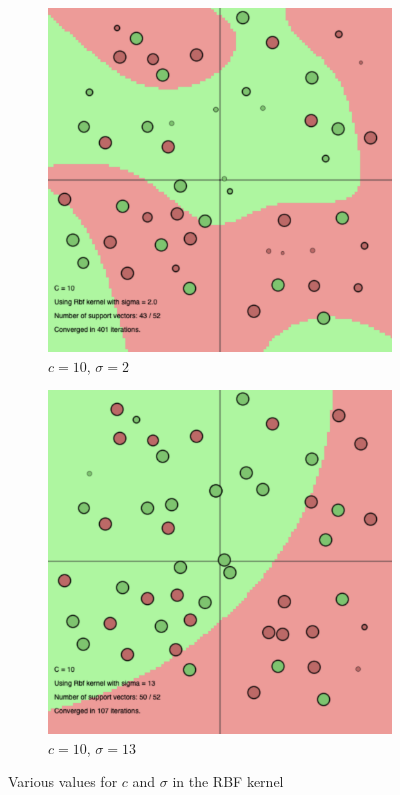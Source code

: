 \documentclass[a4paper, 11pt, one column]{article}
\begin{document}
\begin{figure}
\bigskip
\hspace*{\fill}
\begin{subfigure}{0.3\textwidth}
   \includegraphics[width=\linewidth]{images/rbf_c_10_s_2.png}
   \caption{$c=10$, $\sigma=2$} \label{fig:x_g}
\end{subfigure}%
\hspace*{0.05\textwidth}%
\begin{subfigure}{0.3\textwidth}
   \includegraphics[width=\linewidth]{images/rbf_c_10_s_13.png}
   \caption{$c=10$, $\sigma=13$} \label{fig:x_h}
\end{subfigure}
\hspace*{\fill}

\caption{Various values for $c$ and $\sigma$ in the RBF kernel}
    \label{fig:c_and_sigma}
\end{figure}
\end{document}
